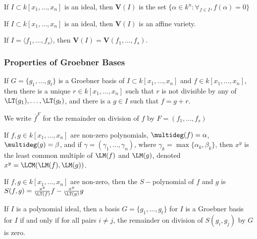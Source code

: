 \documentclass[crop=false,class=article,oneside]{standalone}
\begin{document}
            \begin{definition}
                If $I\subset k[x_1,\hdots ,x_n]$ is an ideal,
                then $\textbf{V}(I)$ is the set
                $\{\alpha\in k^n:\forall_{f\in I},f(\alpha)=0\}$
            \end{definition}
            \begin{theorem}
                If $I\subset k[x_1,\hdots ,x_n]$ is an ideal,
                then $\textbf{V}(I)$ is an affine variety.
            \end{theorem}
            \begin{theorem}
                If $I=\langle f_1,\hdots, f_s\rangle$,
                then $\textbf{V}(I)=\mathbf{V}(f_1,\hdots,f_s)$.
            \end{theorem}
        \subsubsection{Properties of Groebner Bases}
            \begin{theorem}
                If $G=\{g_1,\hdots, g_t\}$ is a Groebner basis 
                of $I\subset k[x_1,\hdots ,x_n]$ and
                $f\in k[x_1,\hdots ,x_n]$, then there is a
                unique $r\in k[x_1,\hdots ,x_n]$ such that $r$
                is not divisible by any of
                $\LT(g_1),\hdots,\LT(g_t)$, and there is a
                $g\in I$ such that $f=g+r$. 
            \end{theorem}
            \begin{notation}
                We write $\overline{f}^{F}$ for the remainder
                on division of $f$ by $F=(f_{1},\hdots,f_{s})$
            \end{notation}
            \begin{definition}
                If $f,g\in k[x_1,\hdots ,x_n]$ are
                non-zero polynomials,
                $\multideg(f)=\alpha$, $\multideg(g)=\beta$,
                and if $\gamma=(\gamma_1,\hdots, \gamma_n)$,
                where $\gamma_k=\max\{\alpha_k,\beta_k\}$,
                then $x^y$ is the least common multiple of
                $\LM(f)$ and $\LM(g)$, denoted
                $x^{y}=\LCM(\LM(f),\LM(g))$.
            \end{definition}
            \begin{definition}
                If $f,g\in k[x_1,\hdots ,x_n]$ are non-zero,
                then the $S-$polynomial of $f$ and $g$ is
                $S(f,g)=\frac{x^y}{\LT(f)}f-\frac{x^y}{\LT(g)}g$
            \end{definition}
            \begin{theorem}
                If $I$ is a polynomial ideal, then a basis
                $G=\{g_1,\hdots, g_t\}$ for $I$ is a
                Groebner basis for $I$ if and only if for
                all pairs $i\ne j$, the remainder on
                division of $S(g_i,g_j)$ by $G$ is zero.
            \end{theorem}
\end{document}
